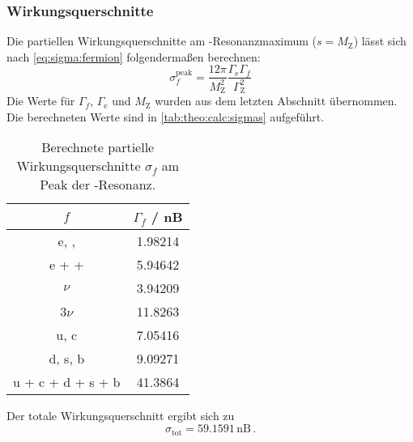 \subsubsection{Wirkungsquerschnitte}
Die partiellen Wirkungsquerschnitte am \Z-Resonanzmaximum ($s = M_\text{Z}$) lässt sich nach \autoref{eq:sigma:fermion} folgendermaßen berechnen:
\begin{equation}
    \sigma_f^\text{peak} = \frac{12 \pi}{M_\text{Z}^2} \frac{\Gamma_\text{e} \Gamma_f}{\Gamma_\text{Z}^2}
\end{equation}
Die Werte für $\Gamma_f$, $\Gamma_\text{e}$ und $M_\text{Z}$ wurden aus dem letzten Abschnitt übernommen. Die berechneten Werte sind in 
\autoref{tab:theo:calc:sigmas} aufgeführt.
\begin{table}[H]
    \caption{Berechnete partielle Wirkungsquerschnitte $\sigma_f$ am Peak der \Z-Resonanz.}
    \begin{center}
        \begin{tabular}{|c|c|}
            \hline
            $f$ 					& $\Gamma_f$ / nB 	\\ \hline
      		e, \textmu, \texttau	& 1.98214			\\ \hline
  			e + \textmu + \texttau	& 5.94642			\\ \hline
			$\nu$					& 3.94209			\\ \hline
			3$\nu$					& 11.8263			\\ \hline
			u, c					& 7.05416			\\ \hline
			d, s, b					& 9.09271			\\ \hline
			u + c + d  + s + b		& 41.3864			\\ \hline
        \end{tabular}
    \end{center}
    \label{tab:theo:calc:sigmas}
\end{table}
Der totale Wirkungsquerschnitt ergibt sich zu
\begin{equation}
    \sigma_\text{tot} = 59.1591\,\text{nB} \, .
\end{equation}